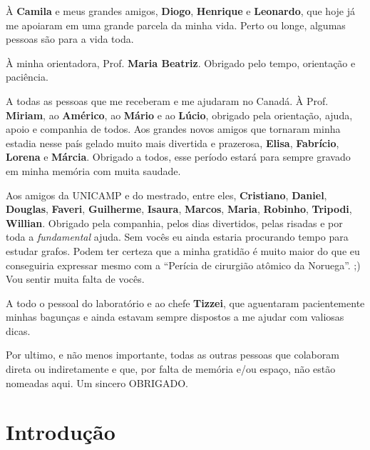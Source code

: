 \documentclass[12pt]{report} %
\begin{document}
    À \textbf{Camila} e meus grandes amigos, \textbf{Diogo}, \textbf{Henrique} e \textbf{Leonardo}, que hoje já me apoiaram em uma grande parcela da minha vida.
    Perto ou longe, algumas pessoas são para a vida toda.

    À minha orientadora, Prof. \textbf{Maria Beatriz}. Obrigado pelo tempo, orientação e paciência.

    A todas as pessoas que me receberam e me ajudaram no Canadá.
    À Prof. \textbf{Miriam}, ao \textbf{Américo}, ao \textbf{Mário} e ao \textbf{Lúcio}, obrigado pela orientação, ajuda, apoio e companhia de todos.
    Aos grandes novos amigos que tornaram minha estadia nesse país gelado muito mais divertida e prazerosa, \textbf{Elisa}, \textbf{Fabrício}, \textbf{Lorena} e \textbf{Márcia}.
    Obrigado a todos, esse período estará para sempre gravado em minha memória com muita saudade.

    Aos amigos da UNICAMP e do mestrado, entre eles, \textbf{Cristiano}, \textbf{Daniel}, \textbf{Douglas}, \textbf{Faveri}, \textbf{Guilherme}, \textbf{Isaura}, \textbf{Marcos}, \textbf{Maria}, \textbf{Robinho}, \textbf{Tripodi}, \textbf{Willian}.
    Obrigado pela companhia, pelos dias divertidos, pelas risadas e por toda a \emph{fundamental} ajuda.
    Sem vocês eu ainda estaria procurando tempo para estudar grafos.
    Podem ter certeza que a minha gratidão é muito maior do que eu conseguiria expressar mesmo com a ``Perícia de cirurgião atômico da Noruega''. ;)
    Vou sentir muita falta de vocês.

    A todo o pessoal do laboratório e ao chefe \textbf{Tizzei}, que aguentaram pacientemente minhas bagunças e ainda estavam sempre dispostos a me ajudar com valiosas dicas.

    Por ultimo, e não menos importante, todas as outras pessoas que colaboram direta ou indiretamente e que, por falta de memória e/ou espaço, não estão nomeadas aqui. Um sincero OBRIGADO.

\afterpreface %
%

\chapter{Introdução}        
       
\end{document}
